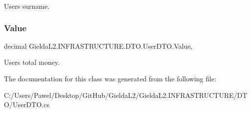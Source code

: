User\textquotesingle{}s surname. 

\mbox{\label{class_gielda_l2_1_1_i_n_f_r_a_s_t_r_u_c_t_u_r_e_1_1_d_t_o_1_1_user_d_t_o_a39911edf0bf2a44d765aad6c7807b809}} 
\subsubsection{\texorpdfstring{Value}{Value}}
{\footnotesize\ttfamily decimal Gielda\+L2.\+I\+N\+F\+R\+A\+S\+T\+R\+U\+C\+T\+U\+R\+E.\+D\+T\+O.\+User\+D\+T\+O.\+Value\hspace{0.3cm}{\ttfamily [get]}, {\ttfamily [set]}}



User\textquotesingle{}s total money. 



The documentation for this class was generated from the following file\+:\begin{DoxyCompactItemize}
\item 
C\+:/\+Users/\+Pawel/\+Desktop/\+Git\+Hub/\+Gielda\+L2/\+Gielda\+L2.\+I\+N\+F\+R\+A\+S\+T\+R\+U\+C\+T\+U\+R\+E/\+D\+T\+O/User\+D\+T\+O.\+cs\end{DoxyCompactItemize}
